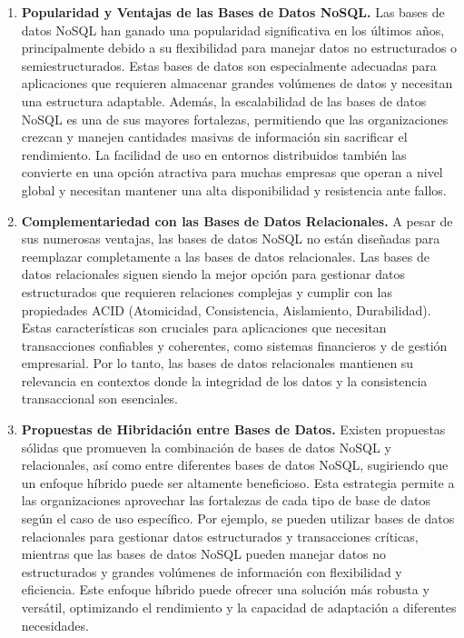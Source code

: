 \documentclass[pdflatex,sn-mathphys-num]{sn-jnl}
\theoremstyle{thmstyleone}%
\theoremstyle{thmstyletwo}%
\theoremstyle{thmstylethree}%
\begin{document}
\begin{enumerate}
    \item \textbf{Popularidad y Ventajas de las Bases de Datos NoSQL.} Las bases de datos NoSQL han ganado una popularidad significativa en los últimos años, principalmente debido a su flexibilidad para manejar datos no estructurados o semiestructurados. Estas bases de datos son especialmente adecuadas para aplicaciones que requieren almacenar grandes volúmenes de datos y necesitan una estructura adaptable. Además, la escalabilidad de las bases de datos NoSQL es una de sus mayores fortalezas, permitiendo que las organizaciones crezcan y manejen cantidades masivas de información sin sacrificar el rendimiento. La facilidad de uso en entornos distribuidos también las convierte en una opción atractiva para muchas empresas que operan a nivel global y necesitan mantener una alta disponibilidad y resistencia ante fallos.
        
    \item \textbf{Complementariedad con las Bases de Datos Relacionales.} A pesar de sus numerosas ventajas, las bases de datos NoSQL no están diseñadas para reemplazar completamente a las bases de datos relacionales. Las bases de datos relacionales siguen siendo la mejor opción para gestionar datos estructurados que requieren relaciones complejas y cumplir con las propiedades ACID (Atomicidad, Consistencia, Aislamiento, Durabilidad). Estas características son cruciales para aplicaciones que necesitan transacciones confiables y coherentes, como sistemas financieros y de gestión empresarial. Por lo tanto, las bases de datos relacionales mantienen su relevancia en contextos donde la integridad de los datos y la consistencia transaccional son esenciales.
    
    \item \textbf{Propuestas de Hibridación entre Bases de Datos.} Existen propuestas sólidas que promueven la combinación de bases de datos NoSQL y relacionales, así como entre diferentes bases de datos NoSQL, sugiriendo que un enfoque híbrido puede ser altamente beneficioso. Esta estrategia permite a las organizaciones aprovechar las fortalezas de cada tipo de base de datos según el caso de uso específico. Por ejemplo, se pueden utilizar bases de datos relacionales para gestionar datos estructurados y transacciones críticas, mientras que las bases de datos NoSQL pueden manejar datos no estructurados y grandes volúmenes de información con flexibilidad y eficiencia. Este enfoque híbrido puede ofrecer una solución más robusta y versátil, optimizando el rendimiento y la capacidad de adaptación a diferentes necesidades.
    

\end{enumerate}
\end{document}
